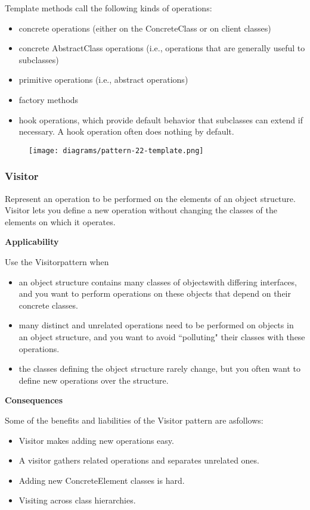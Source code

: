\documentclass{article}
\begin{document}
Template methods call the following kinds of operations:
\begin{itemize}
    \item concrete operations (either on the ConcreteClass or on client classes)
    \item concrete AbstractClass operations (i.e., operations that are generally useful to subclasses)
    \item primitive operations (i.e., abstract operations)
    \item factory methods
    \item hook operations, which provide default behavior that subclasses can extend if necessary. A hook operation often does nothing by default.
\end{itemize}

\begin{figure}[h]
    \centering
    \texttt{[image: diagrams/pattern-22-template.png]}
\end{figure}


\newpage
\subsubsection{Visitor}
Represent an operation to be performed on the elements of an object structure. Visitor lets you define a new operation without changing the classes of the elements on which it operates.

\textbf{Applicability}

Use the Visitorpattern when

\begin{itemize}
    \item an object structure contains many classes of objectswith differing interfaces, and you want to perform operations on these objects that depend on their concrete classes.
    \item  many distinct and unrelated operations need to be performed on objects in an object structure, and you want to avoid ``polluting" their classes with these operations.
    \item the classes defining the object structure rarely change, but you often want to define new operations over the structure.
\end{itemize}

\textbf{Consequences}

Some of the benefits and liabilities of the Visitor pattern are asfollows:
\begin{itemize}
    \item Visitor makes adding new operations easy.
    \item A visitor gathers related operations and separates unrelated ones.
    \item Adding new ConcreteElement classes is hard.
    \item Visiting across class hierarchies.
\end{itemize}
\end{document}
